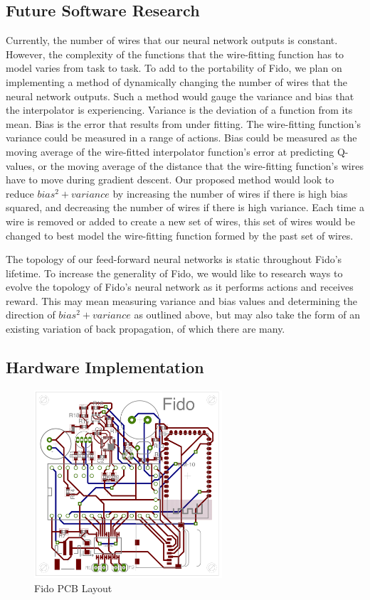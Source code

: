 \subsection{Future Software Research}

Currently, the number of wires that our neural network outputs is constant. However, the complexity of the functions that the wire-fitting function has to model varies from task to task. To add to the portability of Fido, we plan on implementing a method of dynamically changing the number of wires that the neural network outputs. Such a method would gauge the variance and bias that the interpolator is experiencing. Variance is the deviation of a function from its mean. Bias is the error that results from under fitting. The wire-fitting function's variance could be measured in a range of actions. Bias could be measured as the moving average of the wire-fitted interpolator function's error at predicting Q-values, or the moving average of the distance that the wire-fitting function's wires have to move during gradient descent. Our proposed method would look to reduce $bias^2 + variance$ by increasing the number of wires if there is high bias squared, and decreasing the number of wires if there is high variance. Each time a wire is removed or added to create a new set of wires, this set of wires would be changed to best model the wire-fitting function formed by the past set of wires.

The topology of our feed-forward neural networks is static throughout Fido's lifetime. To increase the generality of Fido, we would like to research ways to evolve the topology of Fido's neural network as it performs actions and receives reward. This may mean measuring variance and bias values and determining the direction of $bias^2 + variance$ as outlined above, but may also take the form of an existing variation of back propagation, of which there are many.

\subsection{Hardware Implementation}

\begin{figure}[ht]
	\centering
	\includegraphics[height=7cm]{Figures/boardLayout.png}
	\caption{Fido PCB Layout}
\end{figure}


